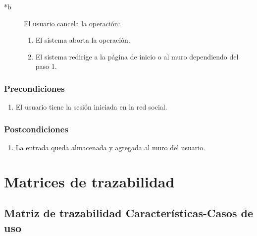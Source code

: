 \documentclass[12pt, a4paper, titlepage]{article}
\begin{document}
\begin{description}
	\item [*b] El usuario cancela la operación:
	\begin{enumerate}
		\item El sistema aborta la operación.
		\item El sistema redirige a la página de inicio o al muro dependiendo del paso 1.
	\end{enumerate}
\end{description}

\subsubsection{Precondiciones}
\begin{enumerate}
	\item El usuario tiene la sesión iniciada en la red social.
\end{enumerate}
\subsubsection{Postcondiciones}
\begin{enumerate}
	\item La entrada queda almacenada y agregada al muro del usuario.
\end{enumerate}



\section{Matrices de trazabilidad}  
\subsection{\large Matriz de trazabilidad Características-Casos de uso}
\end{document}
